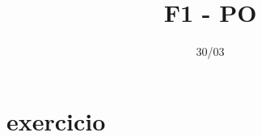 \documentclass[12pt]{article}
\begin{document}
\title{F1 - PO}
\date{30/03}

\maketitle
\tableofcontents
\break

\section{exercicio}

\subsection{}
\end{document}

